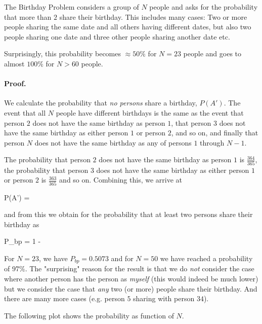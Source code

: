 
The Birthday Problem considers a group of $N$ people and asks for the probability that more than $2$ share their birthday. This includes many cases: Two or more people sharing the same date and all others having different dates, but also two people sharing one date and three other people sharing another date etc.

Surprisingly, this probability becomes $\approx 50\%$ for $N = 23$ people and goes to almost $100\%$ for $N > 60$ people.

\paragraph{Proof.} We calculate the probability that \emph{no persons} share a birthday, $P(A')$. The event that all $N$ people have different birthdays is the same as the event that person $2$ does not have the same birthday as person $1$, that person $3$ does not have the same birthday as either person $1$ or person $2$, and so on, and finally that person $N$ does not have the same birthday as any of persons $1$ through $N-1$.

The probability that person $2$ does not have the same birthday as person $1$ is $\frac{364}{365}$, the probability that person $3$ does not have the same birthday as either person $1$ or person $2$ is $\frac{363}{365}$ and so on. Combining this, we arrive at

\bee
P(A') =  \times {} \times \cdots \times {} 
\eee

and from this we obtain for the probability that at least two persons share their birthday as

\bee
P_{bp} = 1 -  \times {} \times \cdots \times {} 
\eee

For $N=23$, we have $P_{bp} = 0.5073$ and for $N=50$ we have reached a probability of $97\%$. The "surprising" reason for the result is that we do \emph{not} consider the case where another person has the person as \emph{myself} (this would indeed be much lower) but we consider the case that \emph{any} two (or more) people share their birthday. And there are many more cases (e.g. person $5$ sharing with person $34$).

The following plot shows the probability as function of $N$.

